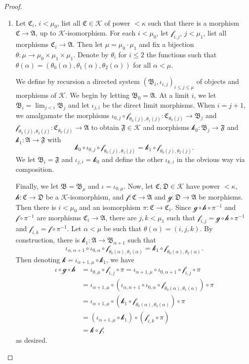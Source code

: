 \documentclass[a4paper]{amsart}
\theoremstyle{definition}
\theoremstyle{remark}
\newcommand{\A}{\mathcal{A}}
\newcommand{\B}{\mathcal{B}}
\newcommand{\C}{\mathcal{C}}
\newcommand{\D}{\mathcal{D}}
\newcommand{\F}{\mathcal{F}}
\newcommand{\K}{\mathcal{K}}
\theoremstyle{definition}
\renewcommand{\A}{\mathfrak{A}}
\renewcommand{\B}{\mathfrak{B}}
\renewcommand{\C}{\mathfrak{C}}
\renewcommand{\D}{\mathfrak{D}}
\renewcommand{\F}{\mathfrak{F}}
\newcommand{\f}{\mathcal{f}}
\newcommand{\g}{\mathcal{g}}
\newcommand{\h}{\mathcal{h}}
\renewcommand{\k}{\mathcal{k}}
\begin{document}
\begin{proof}\quad
    \renewcommand{\i}{\mathcal{i}}
    \begin{enumerate}
        \item Let $\C_i$, $i<\mu_0$, list all $\C\in\K$ of power $<\kappa$ such that there is a morphism $\C\to\A$, up to $\K$-isomorphism. For each $i<\mu_0$, let $\f_{i,j}$, $j<\mu_1$, list all morphisms $\C_i\to\A$. Then let $\mu = \mu_0\cdot\mu_1$ and fix a bijection $\theta\colon\mu\to\mu_0\times\mu_1\times\mu_1$. Denote by $\theta_i$ for $i\leq 2$ the functions such that  $\theta(\alpha) = (\theta_0(\alpha),\theta_1(\alpha),\theta_2(\alpha))$ for all $\alpha<\mu$. 
        
        We define by recursion a directed system $(\B_i,\iota_{i,j})_{i\leq j\leq\mu}$ of objects and morphisms of $\K$. We begin by letting $\B_0 = \A$. At a limit $i$, we let $\B_i = \lim_{j<i}\B_j$ and let $\iota_{j,i}$ be the direct limit morphisms. When $i = j+1$, we amalgamate the morphisms $\iota_{0,j}\circ\f_{\theta_0(j),\theta_1(j)}\colon\C_{\theta_0(j)}\to\B_j$ and $\f_{\theta_0(j),\theta_2(j)}\colon\C_{\theta_0(j)}\to\A$ to obtain $\F\in\K$ and morphisms $\k_0\colon\B_j\to\F$ and $\k_1\colon\A\to\F$ with
        \[
            \k_0\circ\iota_{0,j}\circ\f_{\theta_0(j),\theta_1(j)} = \k_1\circ\f_{\theta_0(j),\theta_2(j)}.
        \]
        We let $\B_i = \F$ and $\iota_{j,i} = \k_0$ and define the other $\iota_{k,i}$ in the obvious way via composition.

        Finally, we let $\B = \B_\mu$ and $\iota = \iota_{0,\mu}$. Now, let $\C,\D\in\K$ have power $<\kappa$, $\h\colon\C\to\D$ be a $\K$-isomorphism, and $\f\colon\C\to\A$ and $\g\colon\D\to\A$ be morphisms. Then there is $i<\mu_0$ and an isomorphism $\pi\colon\C\to\C_i$. Since $\g\circ\h\circ\pi^{-1}$ and $\f\circ\pi^{-1}$ are morphisms $\C_i\to\A$, there are $j,k<\mu_1$ such that $\f_{i,j} = \g\circ\h\circ\pi^{-1}$ and $\f_{i,k} = \f\circ\pi^{-1}$. Let $\alpha<\mu$ be such that $\theta(\alpha) = (i,j,k)$. By construction, there is $\k_1\colon\A\to\B_{\alpha+1}$ such that
        \[
            \iota_{\alpha,\alpha+1}\circ\iota_{0,\alpha}\circ\f_{\theta_0(\alpha),\theta_1(\alpha)} = \k_1\circ\f_{\theta_0(\alpha),\theta_2(\alpha)}.
        \]
        Then denoting $\k = \iota_{\alpha+1,\mu}\circ\k_1$, we have
        \begin{align*}
            \iota\circ\g\circ\h &= \iota_{0,\mu}\circ\f_{i,j}\circ\pi = \iota_{\alpha+1,\mu}\circ\iota_{0,\alpha+1}\circ\f_{i,j}\circ\pi \\
            &= \iota_{\alpha+1,\mu}\circ(\iota_{\alpha,\alpha+1}\circ\iota_{0,\alpha}\circ\f_{\theta_0(\alpha),\theta_1(\alpha)})\circ\pi \\
            &= \iota_{\alpha+1,\mu}\circ(\k_1\circ\f_{\theta_0(\alpha),\theta_2(\alpha)})\circ\pi \\
            &= (\iota_{\alpha+1,\mu}\circ\k_1)\circ(\f_{i,k}\circ\pi) \\
            &= \k\circ\f,
        \end{align*}
        as desired.


\end{enumerate}
\end{proof}
\end{document}
